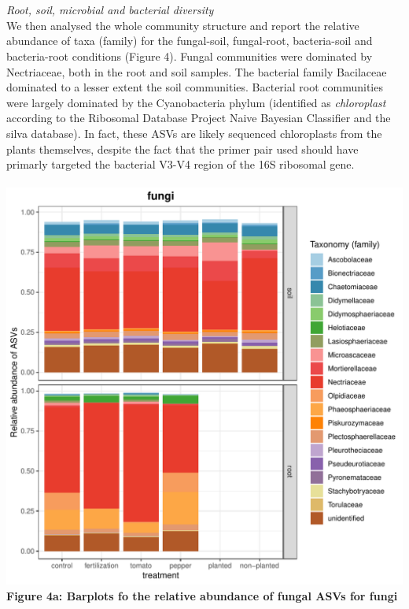 \documentclass[11pt,]{article}
\begin{document}
~\\
\hspace*{0.333em}\\
\emph{Root, soil, microbial and bacterial diversity}\\
We then analysed the whole community structure and report the relative
abundance of taxa (family) for the fungal-soil, fungal-root,
bacteria-soil and bacteria-root conditions (Figure 4). Fungal
communities were dominated by Nectriaceae, both in the root and soil
samples. The bacterial family Bacilaceae dominated to a lesser extent
the soil communities. Bacterial root communities were largely dominated
by the Cyanobacteria phylum (identified as \emph{chloroplast} according
to the Ribosomal Database Project Naive Bayesian Classifier and the
silva database). In fact, these ASVs are likely sequenced chloroplasts
from the plants themselves, despite the fact that the primer pair used
should have primarly targeted the bacterial V3-V4 region of the 16S
ribosomal gene.\\
\hspace*{0.333em}\\
\includegraphics[width=7.29167in]{../figures/Figure4_FAMILY_barplots_fungi.pdf}\\
\textbf{Figure 4a: Barplots fo the relative abundance of fungal ASVs for
fungi}\\
\end{document}
